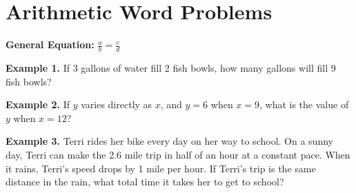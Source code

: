 \section{Arithmetic Word Problems}

\bigskip
\textbf{General Equation:} $\frac{a}{b}=\frac{c}{d}$

\vfill
\textbf{Example 1.} If 3 gallons of water fill 2 fish bowls, how many gallons will fill 9 fish bowls?

\vfill
\textbf{Example 2.} If $y$ varies directly as $x$, and $y=6$ when $x=9$, what is the value of $y$ when $x=12$?

\vfill
\textbf{Example 3.} Terri rides her bike every day on her way to school. On a sunny day, Terri can make the 2.6 mile trip in half of an hour at a constant pace. When it rains, Terri's speed drops by 1 mile per hour. If Terri's trip is the same distance in the rain, what total time it takes her to get to school?

\vfill
\newpage
\setlength{\columnseprule}{1pt}

